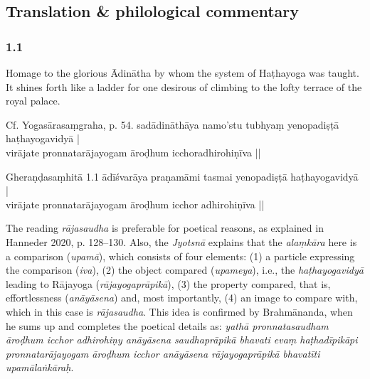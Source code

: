 


\pagestyle{HPed}
\begin{ekdosis}

\chapter*{Translation \& philological commentary}
\subsection*{1.1}
\begin{translation}[hp01_001]
Homage to the glorious Ādinātha by whom the system of Haṭhayoga was taught. It shines forth like a ladder for one desirous of climbing to the lofty terrace of the royal palace.
\end{translation}

\begin{testimonia}[hp01_001]
Cf. Yogasārasaṃgraha, p. 54.
\startverse
sadādināthāya namo'stu tubhyaṃ yenopadiṣṭā haṭhayogavidyā | \\
virājate pronnatarājayogam āroḍhum icchoradhirohiṇīva ||
\endverse

Gheraṇḍasaṃhitā 1.1
\startverse
ādīśvarāya praṇamāmi tasmai yenopadiṣṭā haṭhayogavidyā | \\
virājate pronnatarājayogam āroḍhum icchor adhirohiṇīva ||
\endverse
\end{testimonia}

\begin{philcomm}[hp01_001]
The reading \emph{rājasaudha} is preferable for poetical reasons, as explained in Hanneder 2020, p. 128–130. Also, the \emph{Jyotsnā} explains that the \emph{alaṃkāra} here is a comparison (\emph{upamā}), which consists of four elements: (1) a particle expressing the comparison
(\emph{iva}), (2) the object compared (\emph{upameya}), i.e., the \emph{haṭhayogavidyā} leading to Rājayoga (\emph{rājayogaprāpikā}), (3) the property compared, that is, effortlessness (\emph{anāyāsena}) and, most importantly, (4) an image to compare with, which in this case is \emph{rājasaudha}. This idea is confirmed by Brahmānanda, when he sums up and completes the poetical details as: \emph{yathā pronnatasaudham āroḍhum icchor adhirohiṇy anāyāsena saudhaprāpikā bhavati evaṃ haṭhadīpikāpi pronnatarājayogam āroḍhum icchor anāyāsena rājayogaprāpikā bhavatīti upamālaṅkāraḥ}.


\end{philcomm}
\end{ekdosis}
